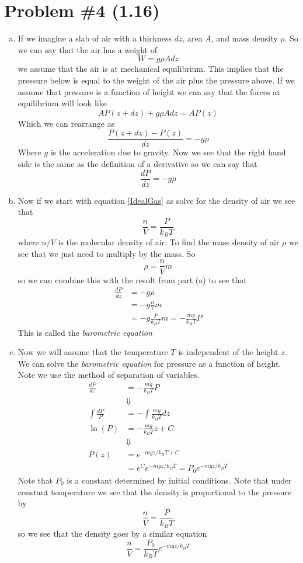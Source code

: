\documentclass[11pt]{article}
\numberwithin{equation}{section}
\begin{document}
\section{Problem \#4 (1.16)}
\begin{enumerate}[(a)]
\item
If we imagine a slab of air with a thickness $dz$, area $A$, and mass density $\rho$. So we can say that the air has a weight of
$$W = g\rho Adz$$
we assume that the air is at mechanical equilibrium. This implies that the pressure below is equal to the weight of the air plus the pressure above. If we assume that pressure is a function of height we can say that the forces at equilibrium will look like
$$AP(z+dz) + g\rho Adz = AP(z)$$
Which we can rearrange as
$$\frac{P(z+dz) - P(z)}{dz} = -g\rho$$
Where $g$ is the acceleration due to gravity. Now we see that the right hand side is the same as the definition of a derivative so we can say that
$$\frac{dP}{dz} = -g\rho$$

\item
Now if we start with equation \ref{IdealGas} as solve for the density of air we see that
$$\frac{n}{V} = \frac{P}{k_BT}$$
where $n/V$ is the molecular density of air. To find the mass density of air $\rho$ we see that we just need to multiply by the mass. So
$$\rho = \frac{n}{V}m$$
so we can combine this with the result from part (a) to see that
\begin{align*}
\frac{dP}{dz} &= -g\rho\\
&= -g\frac{n}{V}m\\
&= -g\frac{P}{k_BT}m = -\frac{mg}{k_BT}P
\end{align*}
This is called the \emph{barometric equation}

\item
Now we will assume that the temperature $T$ is independent of the height $z$. We can solve the \emph{barometric equation} for pressure as a function of height. Note we use the method of separation of variables.
\begin{align}
\frac{dP}{dz} &= -\frac{mg}{k_BT}P\\
&\Downarrow\\
\int\frac{dP}{P} &= -\int\frac{mg}{k_BT}dz\\
\ln(P) &= -\frac{mg}{k_BT}z + C\\
&\Downarrow\\
P(z) &= e^{-mgz/k_BT+C}\\
&= e^Ce^{-mgz/k_BT} = P_0e^{-mgz/k_BT}
\end{align}
Note that $P_0$ is a constant determined by initial conditions. Note that under constant temperature we see that the density is proportional to the pressure by
$$\frac{n}{V} = \frac{P}{k_BT}$$
so we see that the density goes by a similar equation
$$\frac{n}{V} = \frac{P_0}{k_BT}e^{-mgz/k_BT}$$
\end{enumerate}
\end{document}
